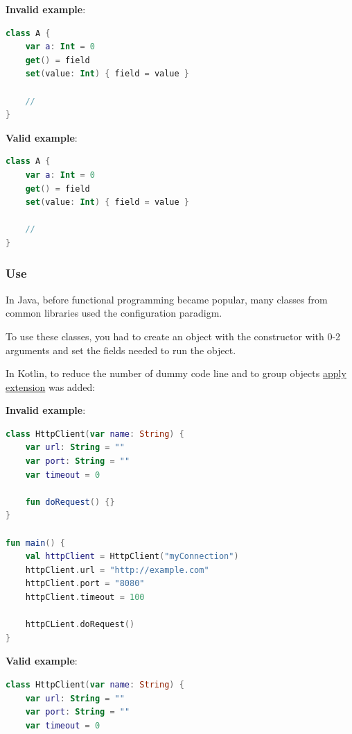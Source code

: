 {{{{\textbf{Invalid example}:

\begin{lstlisting}[language=Kotlin]
class A {
    var a: Int = 0 
    get() = field
    set(value: Int) { field = value }

    //
}
\end{lstlisting}


\textbf{Valid example}:

\begin{lstlisting}[language=Kotlin]
class A {
    var a: Int = 0 
    get() = field
    set(value: Int) { field = value }

    //
}
\end{lstlisting}


\subsubsection*{\textbf{Use}}
\leavevmode\newline

In Java, before functional programming became popular, many classes from common libraries used the configuration paradigm.

To use these classes, you had to create an object with the constructor with 0-2 arguments and set the fields needed to run the object.

In Kotlin, to reduce the number of dummy code line and to group objects \href{https://kotlinlang.org/api/latest/jvm/stdlib/kotlin/apply.html}{apply extension} was added:  

 

\textbf{Invalid example}:

\begin{lstlisting}[language=Kotlin]
class HttpClient(var name: String) {
    var url: String = ""
    var port: String = ""
    var timeout = 0
    
    fun doRequest() {}
}

fun main() {
    val httpClient = HttpClient("myConnection")
    httpClient.url = "http://example.com"
    httpClient.port = "8080"
    httpClient.timeout = 100
    
    httpCLient.doRequest()
}   

\end{lstlisting}


\textbf{Valid example}:

\begin{lstlisting}[language=Kotlin]
class HttpClient(var name: String) {
    var url: String = ""
    var port: String = ""
    var timeout = 0


\end{lstlisting}}}}}
